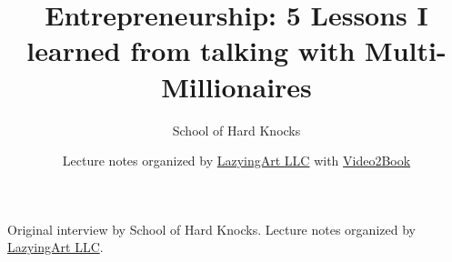 \documentclass[11pt,oneside]{book}
\begin{document}
\frontmatter
\title{Entrepreneurship: 5 Lessons I learned from talking with Multi-Millionaires}
\author{School of Hard Knocks}
\date{Lecture notes organized by \href{https://lazying.art}{LazyingArt LLC} with \href{https://github.com/lachlanchen/Video2Book}{Video2Book}}
\maketitle
\begin{center}
\small Original interview by School of Hard Knocks. Lecture notes organized by \href{https://lazying.art}{LazyingArt LLC}.
\end{center}
\clearpage
\mainmatter

\end{document}
